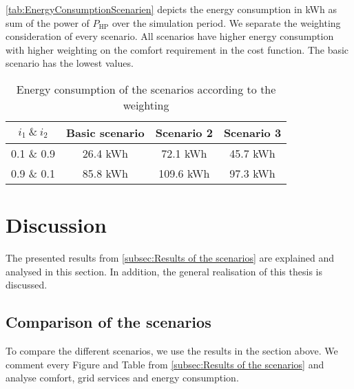 \autoref{tab:EnergyConsumptionScenarien} depicts the energy consumption in kWh as sum of the power of $P_\text{HP}$ over the simulation period. We separate the weighting consideration of every scenario. All scenarios have higher energy consumption with higher weighting on the comfort requirement in the cost function. The basic scenario has the lowest values. 
    \begin{table}[H]
        \centering
        \begin{tabular}{c||c|c|c}
          $i_\text{1} \ \& \  i_\text{2}$  &  Basic scenario & Scenario 2 & Scenario 3\\
          \hline  \hline
             0.1 \& 0.9 & 26.4 kWh & 72.1 kWh & 45.7 kWh\\
             0.9 \& 0.1 & 85.8 kWh & 109.6 kWh & 97.3 kWh\\
        \end{tabular}
        \caption{Energy consumption of the scenarios according to the weighting}
        \label{tab:EnergyConsumptionScenarien}
    \end{table}

\section{Discussion}
\label{sec:discussion}
The presented results from \autoref{subsec:Results of the scenarios} are explained and analysed in this section. In addition, the general realisation of this thesis is discussed.

\subsection{Comparison of the scenarios}
\label{subsec:Comparison fo the scenarios}
To compare the different scenarios, we use the results in the section above. We comment every Figure and Table from \autoref{subsec:Results of the scenarios} and analyse comfort, grid services and energy consumption.\newline


